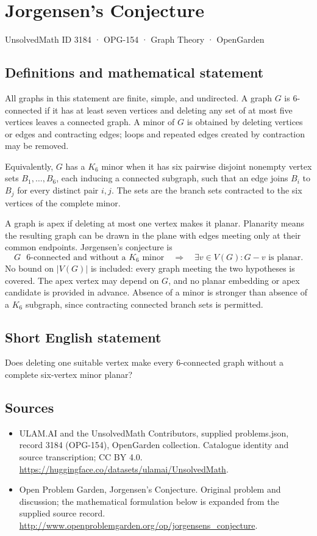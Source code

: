 \documentclass[11pt,a4paper]{article}
\begin{document}
\section*{Jorgensen's Conjecture}\label{3184}
{\small UnsolvedMath ID 3184 · OPG-154 · Graph Theory · OpenGarden}
\subsection{Definitions and mathematical statement}
All graphs in this statement are finite, simple, and
undirected. A graph $G$ is $6$-connected if it has at
least seven vertices and deleting any set of at most
five vertices leaves a connected graph. A minor of
$G$ is obtained by deleting vertices or edges and
contracting edges; loops and repeated edges created
by contraction may be removed.

Equivalently, $G$ has a $K_6$ minor when it has six
pairwise disjoint nonempty vertex sets
$B_1,\ldots,B_6$, each inducing a connected subgraph,
such that an edge joins $B_i$ to $B_j$ for every
distinct pair $i,j$. The sets are the branch sets
contracted to the six vertices of the complete minor.

A graph is apex if deleting at most one vertex makes
it planar. Planarity means the resulting graph can
be drawn in the plane with edges meeting only at
their common endpoints. Jørgensen's conjecture is
\[
 G\text{ $6$-connected and without a $K_6$ minor}
 \quad\Longrightarrow\quad
 \exists v\in V(G):G-v\text{ is planar}.
\]
No bound on $|V(G)|$ is included: every graph meeting
the two hypotheses is covered. The apex vertex may
depend on $G$, and no planar embedding or apex
candidate is provided in advance. Absence of a minor
is stronger than absence of a $K_6$ subgraph, since
contracting connected branch sets is permitted.
\subsection{Short English statement}
Does deleting one suitable vertex make every 6-connected graph without a complete six-vertex minor planar?
\subsection{Sources}
\begin{itemize}
\item[S1] ULAM.AI and the UnsolvedMath Contributors, supplied problems.json, record 3184 (OPG-154), OpenGarden collection. Catalogue identity and source transcription; CC BY 4.0.
\url{https://huggingface.co/datasets/ulamai/UnsolvedMath}.
\item[S2] Open Problem Garden, Jorgensen's Conjecture. Original problem and discussion; the mathematical formulation below is expanded from the supplied source record.
\url{http://www.openproblemgarden.org/op/jorgensens_conjecture}.
\end{itemize}
\end{document}

